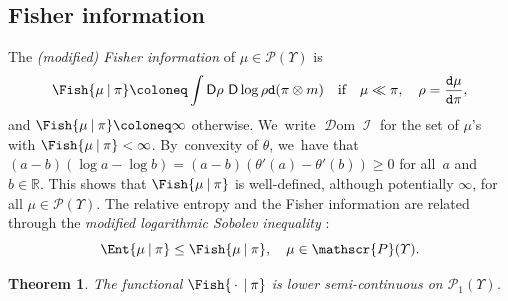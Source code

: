 \documentclass[10pt]{amsart}
\newcommand{\real}{\mathbb{R}}
\newtheorem{theorem}{Theorem}[section]
\theoremstyle{definition}
\theoremstyle{remark}
\newcommand{\given}[1][]{%
\nonscript\:#1\vert
\allowbreak
\nonscript\:
\mathopen{}}
\DeclareMathOperator{\fish}{\mathcal{I}}
\DeclareMathOperator{\dom}{\mathscr{D}om}
\newcommand{\emparg}{\,\cdot\,}
\begin{document}
\subsection{Fisher information}
The \emph{(modified) Fisher information} of $\mu \in \mathscr{P}(\varUpsilon)$ is
\begin{equation*}
\Fish{\mu \given \pi} \coloneq \int \mathsf{D} \rho \ \mathsf{D} \log \rho \mathtt{d} (\pi \otimes m) \quad \text{if} \quad \mu\ll \pi , \quad \rho= \frac{\mathtt{d} \mu}{\mathtt{d} \pi},
\end{equation*}
and $\Fish{\mu \given \pi} \coloneq \infty$ otherwise. We~write $\dom \fish$ for the set of $\mu$'s with $\Fish{\mu \given \pi} < \infty$.
By~convexity of $\theta$, we~have that $(a - b) (\log a - \log b) = (a-b) (\theta'(a) - \theta'(b)) \geq 0$ for all~$a$ and~$b \in \real$.
This shows that $\Fish{\mu \given \pi}$ is well-defined, although potentially $\infty$, for all $\mu \in \mathscr{P}(\varUpsilon)$.
The relative entropy and the Fisher information are related through the \emph{modified logarithmic Sobolev inequality} \cite[Cor.\,2.2]{Wu}:
\begin{equation}\label{e:lsi}
\Ent{\mu \given \pi} \leq \Fish{\mu \given \pi}, \quad \mu \in \mathscr{P}(\varUpsilon).
\end{equation}

\begin{theorem}\label{t:lsc-I}
The functional $\Fish{\emparg \given \pi}$ is lower semi-continuous on $\mathscr{P}_{1}(\varUpsilon)$.
\end{theorem}
\end{document}
